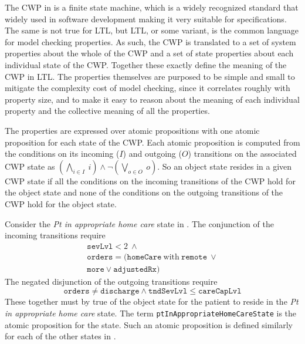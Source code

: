 The CWP in  is a finite state machine, which is a widely recognized standard that widely used in software development making it very suitable for specifications. The same is not true for LTL, but LTL, or some variant, is the common language for model checking properties. As such, the CWP is translated to a set of system properties about the whole of the CWP and a set of state properties about each individual state of the CWP. Together these exactly define the meaning of the CWP in LTL. The properties themselves are purposed to be simple and small to mitigate the complexity cost of model checking, since it correlates roughly with property size, and to make it easy to reason about the meaning of each individual property and the collective meaning of all the properties. 

The properties are expressed over atomic propositions with one atomic proposition for each state of the CWP. Each atomic proposition is computed from the conditions on its incoming ($I$) and outgoing ($O$) transitions on the associated CWP state as $(\bigwedge_{i \in I}\ i) \wedge \neg(\bigvee_{o \in O}\ o)$. So an object state resides in a given CWP state if all the conditions on the incoming transitions of the CWP hold for the object state and none of the conditions on the outgoing transitions of the CWP hold for the object state.

Consider the \emph{Pt in appropriate home care} state in . The conjunction of the incoming transitions require
%
\[
\begin{array}{l}
  \mathtt{sevLvl} < 2\ \wedge\ \\
  \mathtt{orders} = (\mathtt{homeCare}\ \mathrm{with}\ \mathtt{remote}\ \vee \\
                    \mathtt{more} \vee \mathtt{adjustedRx})
\end{array}
\]
%
The negated disjunction of the outgoing transitions require
%
\[
  \mathtt{orders} \neq \mathtt{discharge} \wedge \mathtt{tndSevLvl} \le \mathtt{careCapLvl}
\]
%
\noindent These together must by true of the object state for the patient to reside in the \emph{Pt in appropriate home care} state. The term \texttt{ptInAppropriateHomeCareState} is the atomic proposition for the state. Such an atomic proposition is defined similarly for each of the other states in .

